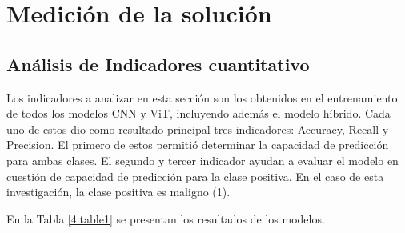 \section{Medición de la solución}

\subsection{Análisis de Indicadores cuantitativo}
Los indicadores a analizar en esta sección son los obtenidos en el entrenamiento de todos los modelos CNN y ViT, incluyendo además el modelo híbrido. Cada uno de estos dio como resultado principal tres indicadores: Accuracy, Recall y Precision. El primero de estos permitió determinar la capacidad de predicción para ambas clases. El segundo y tercer indicador ayudan a evaluar el modelo en cuestión de capacidad de predicción para la clase positiva. En el caso de esta investigación, la clase positiva es maligno (1).

En la Tabla \ref{4:table1} se presentan los resultados de los modelos.

